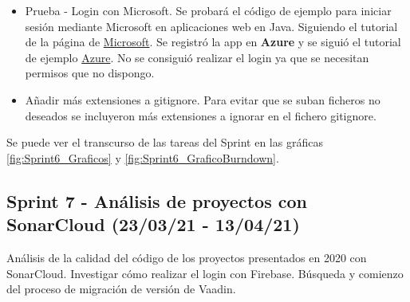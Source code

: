 \begin{itemize}
	\item Prueba - Login con Microsoft.
		Se probará el código de ejemplo para iniciar sesión mediante Microsoft en aplicaciones web en Java. Siguiendo el tutorial de la página de \href{https://docs.microsoft.com/en-us/azure/active-directory/develop/quickstart-v2-java-webapp}{Microsoft}. Se registró la app en \textbf{Azure} y se siguió el tutorial de ejemplo \href{https://portal.azure.com/#blade/Microsoft_AAD_RegisteredApps/ApplicationsListBlade/quickStartType/JavaQuickstartPage/sourceType/docs}{Azure}. No se consiguió realizar el login ya que se necesitan permisos que no dispongo.
	\item Añadir más extensiones a gitignore. 
		Para evitar que se suban ficheros no deseados se incluyeron más extensiones a ignorar en el fichero gitignore. 
	
\end{itemize}

Se puede ver el transcurso de las tareas del Sprint en las gráficas \ref{fig:Sprint6_Graficos} y \ref{fig:Sprint6_GraficoBurndown}.



\subsection{Sprint 7 - Análisis de proyectos con SonarCloud (23/03/21 - 13/04/21)}
Análisis de la calidad del código de los proyectos presentados en 2020 con SonarCloud. Investigar cómo realizar el login con Firebase. Búsqueda y comienzo del proceso de migración de versión de Vaadin.

